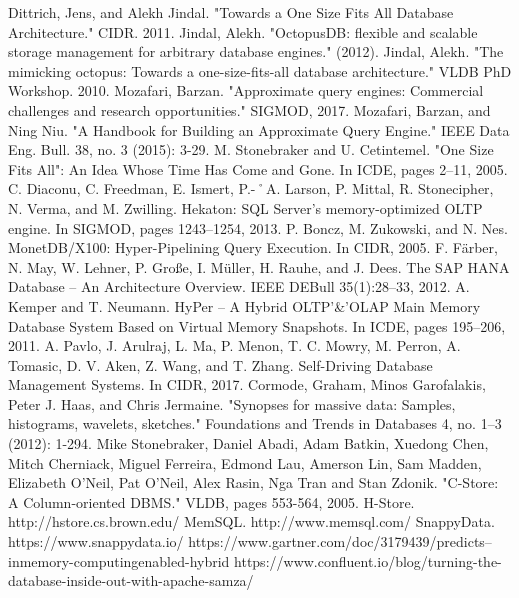 \documentclass[10pt, conference, compsocconf]{IEEEtran}
\begin{document}
\begin{thebibliography}{1}
Dittrich, Jens, and Alekh Jindal. "Towards a One Size Fits All Database Architecture." CIDR. 2011.
Jindal, Alekh. "OctopusDB: flexible and scalable storage management for arbitrary database engines." (2012).
Jindal, Alekh. "The mimicking octopus: Towards a one-size-fits-all database architecture." VLDB PhD Workshop. 2010.
Mozafari, Barzan. "Approximate query engines: Commercial challenges and research opportunities." SIGMOD, 2017.
Mozafari, Barzan, and Ning Niu. "A Handbook for Building an Approximate Query Engine." IEEE Data Eng.
Bull. 38, no. 3 (2015): 3-29.
M. Stonebraker and U. Cetintemel. "One Size Fits All": An Idea Whose Time Has Come and Gone. In ICDE, pages 2–11, 2005.
C. Diaconu, C. Freedman, E. Ismert, P.-˚A. Larson, P. Mittal, R. Stonecipher, N. Verma, and M. Zwilling. Hekaton: SQL Server’s memory-optimized OLTP engine. In SIGMOD, pages 1243–1254, 2013.
P. Boncz, M. Zukowski, and N. Nes. MonetDB/X100: Hyper-Pipelining Query Execution. In CIDR, 2005.
F. Färber, N. May, W. Lehner, P. Große, I. Müller, H. Rauhe, and J. Dees. The SAP HANA Database – An Architecture Overview. IEEE DEBull 35(1):28–33, 2012.
A. Kemper and T. Neumann. HyPer – A Hybrid OLTP'\&'OLAP Main Memory Database System Based on Virtual Memory Snapshots. In ICDE, pages 195–206, 2011.
A. Pavlo, J. Arulraj, L. Ma, P. Menon, T. C. Mowry, M. Perron, A. Tomasic, D. V. Aken, Z. Wang, and T. Zhang. Self-Driving Database Management Systems. In CIDR, 2017.
Cormode, Graham, Minos Garofalakis, Peter J. Haas, and Chris Jermaine. "Synopses for massive data: Samples, histograms, wavelets, sketches." Foundations and Trends in Databases 4, no. 1–3 (2012): 1-294.
Mike Stonebraker, Daniel Abadi, Adam Batkin, Xuedong Chen, Mitch Cherniack, Miguel Ferreira, Edmond Lau, Amerson Lin, Sam Madden, Elizabeth O'Neil, Pat O'Neil, Alex Rasin, Nga Tran and Stan Zdonik. "C-Store: A Column-oriented DBMS." VLDB, pages 553-564, 2005. 
H-Store. http://hstore.cs.brown.edu/
MemSQL. http://www.memsql.com/
SnappyData. https://www.snappydata.io/
https://www.gartner.com/doc/3179439/predicts--inmemory-computingenabled-hybrid
https://www.confluent.io/blog/turning-the-database-inside-out-with-apache-samza/

\end{thebibliography}
\end{document}
